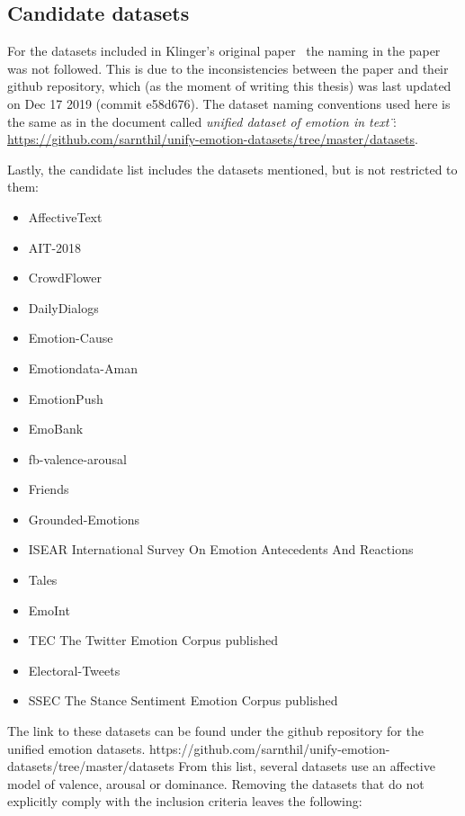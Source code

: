 \subsection{Candidate datasets}\label{sub:Candidate datasets}
For the datasets included in Klinger's original paper~\cite{klinger2018analysis} the naming in the paper was not followed. This is due to the inconsistencies between the paper and their github repository, which (as the moment of writing this thesis) was last updated on Dec 17 2019 (commit e58d676). The dataset naming conventions used here is the same as in the document called \" \emph{unified dataset of emotion in text} \": \url{https://github.com/sarnthil/unify-emotion-datasets/tree/master/datasets}.

Lastly, the candidate list includes the datasets mentioned, but is not restricted to them:
\begin{itemize}
  \item AffectiveText~\cite{strapparava2007semeval} %
  \item AIT-2018~\cite{SemEval2018Task1} %
  \item CrowdFlower %
  \item DailyDialogs~\cite{li2017dailydialog}
  \item Emotion-Cause~\cite{ghazi2015detecting}
  \item Emotiondata-Aman~\cite{aman2007recognizing} %
  \item EmotionPush~\cite{huang2018emotionpush} %
  \item EmoBank~\cite{buechel2017emobank} %
  \item fb-valence-arousal~\cite{preoctiuc2016modelling} %
  \item Friends~\cite{chen2018emotionlines} %
  \item Grounded-Emotions~\cite{liu2017grounded} %
  \item ISEAR International Survey On Emotion Antecedents And Reactions~\cite{scherer1990international} %
  \item Tales~\cite{alm2005emotions} %
  \item EmoInt~\cite{MohammadB17starsem}
  \item TEC The Twitter Emotion Corpus published~\cite{mohammad2012emotional}
  \item Electoral-Tweets~\cite{mohammad2014semantic}
  \item SSEC The Stance Sentiment Emotion Corpus published~\cite{schuff2017annotation}
\end{itemize}
The link to these datasets can be found under the github repository for the unified emotion datasets.
https://github.com/sarnthil/unify-emotion-datasets/tree/master/datasets
From this list, several datasets use an affective model of valence, arousal or dominance. Removing the datasets that do not explicitly comply with the inclusion criteria leaves the following:

